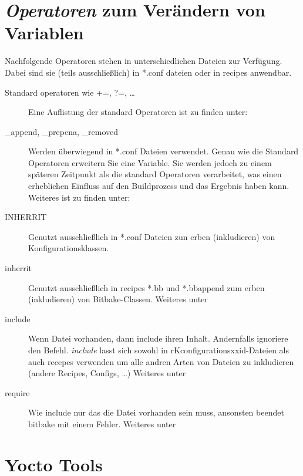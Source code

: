 \section{\textit{Operatoren} zum Verändern von Variablen}
\label{sec:grundlagen_operatoren}

Nachfolgende Operatoren stehen in unterschiedlichen Dateien zur Verfügung. Dabei
sind sie (teils ausschließlich) in *.conf dateien oder in recipes anwendbar.

\begin{description} \item[Standard operatoren wie +=, ?=, \ldots] Eine
        Auflistung der standard Operatoren ist zu finden unter: \cite[Seite
        160]{Gonzalez2018:Embedded_Linux_Development_Using_Yocto_Project_Cookbook_2nd}
    \item[\_append, \_prepena, \_removed] Werden überwiegend in *.conf Dateien
        verwendet. Genau wie die Standard Operatoren erweitern Sie eine
        Variable. Sie werden jedoch zu einem späteren Zeitpunkt als die standard
        Operatoren verarbeitet, was einen erheblichen Einfluss auf den
        Buildprozess und das Ergebnis haben kann. Weiteres ist zu finden unter:
        \cite[Seite
        160]{Gonzalez2018:Embedded_Linux_Development_Using_Yocto_Project_Cookbook_2nd}
    \item[INHERRIT] Genutzt ausschließlich in *.conf Dateien zun erben
        (inkludieren) von Konfigurationsklassen. \item[inherrit] Genutzt
        ausschließlich in recipes *.bb und *.bbappend zum erben (inkludieren)
        von Bitbake-Classen.  Weiteres unter \cite {Yocto:Mega_Manual}
    \item[include] Wenn Datei vorhanden, dann include ihren Inhalt.  Andernfalls
        ignoriere den Befehl.  \textit{include} lasst sich sowohl in
        rKconfigurationsxxid-Dateien als auch recepes verwenden um alle andren
        Arten von Dateien zu inkludieren (andere Recipes, Configs, \ldots)
        Weiteres unter \cite {Yocto:Mega_Manual}
    \item[require] Wie include nur das die Datei vorhanden sein muss, ansonsten
        beendet bitbake mit einem Fehler.  Weiteres unter \cite
        {Yocto:Mega_Manual} \end{description}





\section{Yocto Tools}%
\label{sec:yocto_tools}


